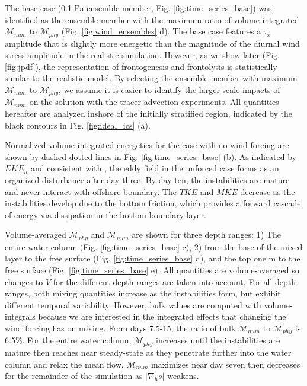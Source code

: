 The base case (0.1 Pa ensemble member, Fig. \ref{fig:time_series_base}) was identified as the ensemble member with the maximum ratio of volume-integrated $\mathcal{M}_{num}$ to $\mathcal{M}_{phy}$ (Fig. \ref{fig:wind_ensembles} d). The base case features a $\tau_x$ amplitude that is slightly more energetic than the magnitude of the diurnal wind stress amplitude in the realistic simulation. However, as we show later (Fig. \ref{fig:jpdf}), the representation of frontogenesis and frontolysis is statistically similar to the realistic model. By selecting the ensemble member with maximum $\mathcal{M}_{num}$ to $\mathcal{M}_{phy}$, we assume it is easier to identify the larger-scale impacts of $\mathcal{M}_{num}$ on the solution with the tracer advection experiments. All quantities hereafter are analyzed inshore of the initially stratified region, indicated by the black contours in Fig. \ref{fig:ideal_ics} (a). 

Normalized volume-integrated energetics for the case with no wind forcing are shown by dashed-dotted lines in Fig. \ref{fig:time_series_base} (b). As indicated by $EKE_n$ and consistent with \citet{Hetland_2017}, the eddy field in the unforced case forms as an organized disturbance after day three. By day ten, the instabilities are mature and never interact with offshore boundary. The $TKE$ and $MKE$ decrease as the instabilities develop due to the bottom friction, which provides a forward cascade of energy via dissipation in the bottom boundary layer. 

Volume-averaged $\mathcal{M}_{phy}$ and $\mathcal{M}_{num}$ are shown for three depth ranges: 1) The entire water column (Fig. \ref{fig:time_series_base} c), 2) from the base of the mixed layer to the free surface (Fig. \ref{fig:time_series_base} d), and the top one m to the free surface (Fig. \ref{fig:time_series_base} e). All quantities are volume-averaged so changes to $V$ for the different depth ranges are taken into account. For all depth ranges, both mixing quantities increase as the instabilities form, but exhibit different temporal variability. However, bulk values are computed with volume-integrals because we are interested in the integrated effects that changing the wind forcing has on mixing. From days 7.5-15, the ratio of bulk $\mathcal{M}_{num}$ to $\mathcal{M}_{phy}$ is 6.5\%. For the entire water column, $\mathcal{M}_{phy}$ increases until the instabilities are mature then reaches near steady-state as they penetrate further into the water column and relax the mean flow. $\mathcal{M}_{num}$ maximizes near day seven then decreases for the remainder of the simulation as $|\nabla_h s|$ weakens.

